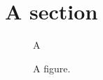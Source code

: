\documentclass{article}
\begin{document}
\section[sec_a]{A section}
\begin{figure}\centering A\caption[fig_a]{A figure.}\end{figure}
\end{document}
